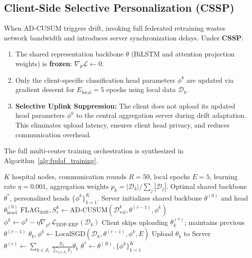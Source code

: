 \documentclass[journal,twocolumn,10pt]{IEEEtran}
\begin{document}
\subsection{Client-Side Selective Personalization (CSSP)}
When AD-CUSUM triggers drift, invoking full federated retraining wastes network bandwidth and introduces server synchronization delays. Under \textbf{CSSP}:
\begin{enumerate}
    \item The shared representation backbone $\theta$ (BiLSTM and attention projection weights) is \textbf{frozen}: $\nabla_\theta \mathcal{L} \leftarrow 0$.
    \item Only the client-specific classification head parameters $\phi^k$ are updated via gradient descent for $E_{\text{local}} = 5$ epochs using local data $\mathcal{D}_k$.
    \item \textbf{Selective Uplink Suppression:} The client does not upload its updated head parameters $\phi^k$ to the central aggregation server during drift adaptation. This eliminates upload latency, ensures client head privacy, and reduces communication overhead.
\end{enumerate}

The full multi-center training orchestration is synthesized in Algorithm~\ref{alg:fpdaf_training}.

\begin{algorithm}[!t]
\caption{End-to-End FPDAF Federated Optimization Loop}\label{alg:fpdaf_training}
\begin{algorithmic}[1]
\REQUIRE $K$ hospital nodes, communication rounds $R = 50$, local epochs $E = 5$, learning rate $\eta = 0.001$, aggregation weights $p_k = |\mathcal{D}_k| / \sum_j |\mathcal{D}_j|$.
\ENSURE Optimal shared backbone $\theta^*$, personalized heads $\{\phi^k\}_{k=1}^K$.
\STATE Server initializes shared backbone $\theta^{(0)}$ and head $\theta_{\text{head}}^{(0)}$
        \STATE $\text{FLAG}_{\text{drift}}, S_r^k \leftarrow \text{AD-CUSUM}(\mathcal{D}_{\text{val}}^k, \theta^{(r-1)}, \phi^{k})$
            \STATE {}
                \STATE $\phi^k \leftarrow \phi^k - \eta \nabla_{\phi^k} \mathcal{L}_{\text{DDP-ERP}}(\mathcal{D}_k)$
            \ENDFOR
            \STATE Client skips uploading $\theta_k^{(r)}$; maintains previous $\theta^{(r-1)}$
        \ELSE
            \STATE {}
            \STATE $\theta_k, \phi^k \leftarrow \text{LocalSGD}(\mathcal{D}_k, \theta^{(r-1)}, \phi^k, E)$
            \STATE Upload $\theta_k$ to Server
        \ENDIF
    \ENDFOR
    \STATE {}
    \STATE $\theta^{(r)} \leftarrow \sum_{k \in \mathcal{S}_r} \frac{p_k}{\sum_{j \in \mathcal{S}_r} p_j} \theta_k$
\ENDFOR
\RETURN $\theta^* \leftarrow \theta^{(R)}, \{\phi^k\}_{k=1}^K$
\end{algorithmic}
\end{algorithm}
\end{document}
